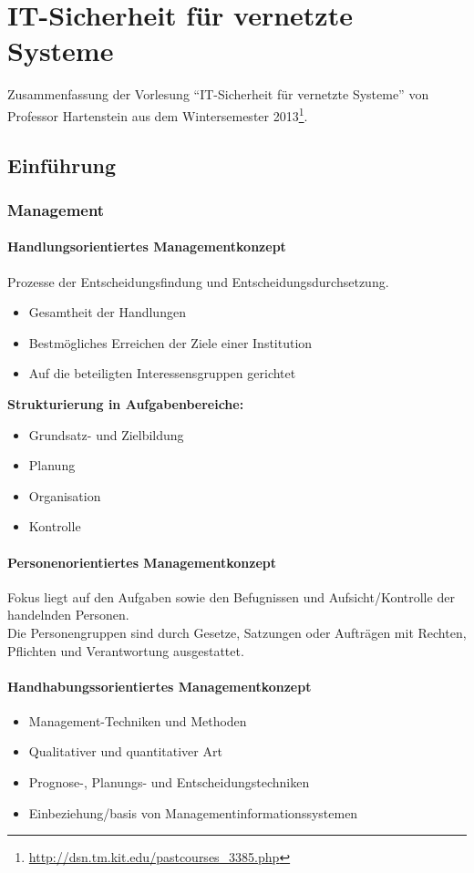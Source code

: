 \chapter{IT-Sicherheit für vernetzte Systeme}
Zusammenfassung der Vorlesung  "`IT-Sicherheit für vernetzte Systeme"' von Professor Hartenstein aus dem Wintersemester 2013\footnote{\url{http://dsn.tm.kit.edu/pastcourses_3385.php}}.

\section{Einführung}

\subsection{Management}

\subsubsection{Handlungsorientiertes Managementkonzept}
Prozesse der Entscheidungsfindung und Entscheidungsdurchsetzung.
\begin{itemize}
	\item Gesamtheit der Handlungen
	\item Bestmögliches Erreichen der Ziele einer Institution
	\item Auf die beteiligten Interessensgruppen gerichtet
\end{itemize}
\textbf{Strukturierung in Aufgabenbereiche:}
\begin{itemize}
	\item Grundsatz- und Zielbildung
	\item Planung
	\item Organisation
	\item Kontrolle
\end{itemize}

\subsubsection{Personenorientiertes Managementkonzept}
Fokus liegt auf den Aufgaben sowie den Befugnissen und Aufsicht/Kontrolle der handelnden Personen.\\
Die Personengruppen sind durch Gesetze, Satzungen oder Aufträgen mit Rechten, Pflichten und Verantwortung ausgestattet.

\subsubsection{Handhabungssorientiertes Managementkonzept}
\begin{itemize}
	\item Management-Techniken und Methoden
	\item Qualitativer und quantitativer Art
	\item Prognose-, Planungs- und Entscheidungstechniken
	\item Einbeziehung/basis von Managementinformationssystemen
\end{itemize}


